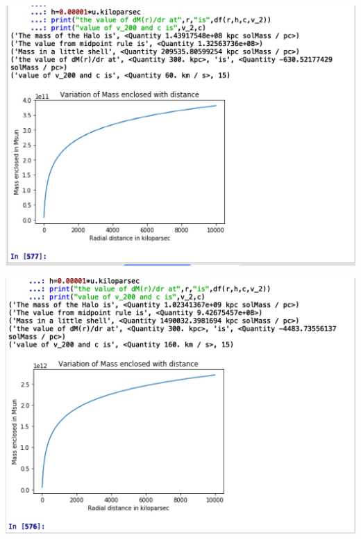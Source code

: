 \documentclass{article}
\begin{document}
\begin{center}
\begin{multicols}{2}
	\begin{center}
        \includegraphics[scale=0.25]{Images/60}
        \end{center}
\columnbreak
	\begin{center}
       \includegraphics[scale=0.25]{Images/160}
       \end{center}
\end{multicols}
\end{center}
\end{document}
